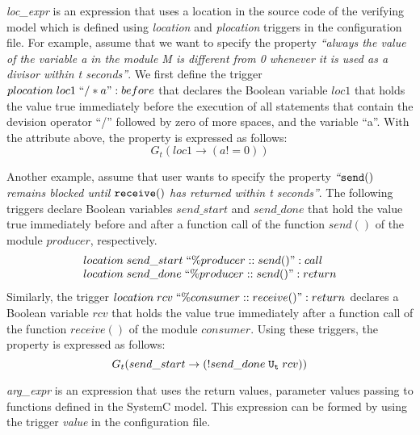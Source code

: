 \documentclass{llncs}
\begin{document}
\textit{loc\_expr} is an expression that uses a location in the source code of the verifying model which is defined using \textit{location} and \textit{plocation} triggers in the configuration file. For example, assume that we want to specify the property \textit{``always the value of the variable a in the module M is different from 0 whenever it is used as a divisor within t seconds''}. We first define the trigger $plocation \; loc1  \; ``/ *a":before$ that declares the Boolean variable $loc1$ that holds the value true immediately before the execution of all statements that contain the devision operator ``/'' followed by zero of more spaces, and the variable ``a''. With the attribute above, the property is expressed as follows:
\begin{displaymath}
G_{t}(loc1 \rightarrow (a != 0))
\end{displaymath}

Another example, assume that user wants to specify the property \textit{``$\begin{tt}send()\end{tt}$ remains blocked until $\begin{tt}receive()\end{tt}$ has returned within t seconds''}. The following triggers declare Boolean variables $send\_start$ and $send\_done$ that hold the value true immediately before and after a function call of the function $send()$ of the module $producer$, respectively.
\begin{displaymath}
\begin{array}{l}
location \; send\_start \; ``\% producer::send()":call\\
location \; send\_done \; ``\% producer::send()":return
\end{array}
\end{displaymath}
Similarly, the trigger $location \; rcv \; ``\% consumer::receive()":return$ declares a Boolean variable $rcv$ that holds the value true immediately after a function call of the function $receive()$ of the module $consumer$. Using these triggers, the property is expressed as follows:
\begin{displaymath}
G_{t}(send\_start \rightarrow(!send\_done \; \begin{tt}U_{t}\end{tt} \; rcv))
\end{displaymath}

\textit{arg\_expr} is an expression that uses the return values, parameter values passing to functions defined in the SystemC model. This expression can be formed by using the trigger \textit{value} in the configuration file.
\end{document}

